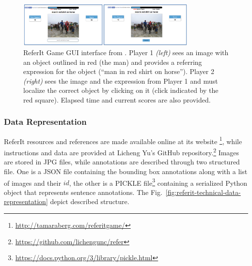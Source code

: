 \begin{figure}
  \centering
  \includegraphics[width=0.8\textwidth]{figures/referitgame-example.png}
  \caption[ReferIt Game GUI interface]{ ReferIt Game GUI interface
  from \cite{kazemzadeh2014referitgame}. Player 1 \textit{(left)} sees
  an image with an object outlined in red (the man) and provides a
  referring expression for the object (``man in red shirt on horse'').
  Player 2 \textit{(right)} sees the image and the expression from
  Player 1 and must localize the correct object by clicking on it
  (click indicated by the red square). Elapsed time and current scores
  are also provided. }
  \label{fig:referitgame-example}
\end{figure}

\subsubsection{Data Representation}
\label{subsec:referit-data-representation}

ReferIt resources and references are made available online at its
website
\footnote{\href{http://tamaraberg.com/referitgame/}{http://tamaraberg.com/referitgame/}},
while instructions and data are provided at Licheng Yu's GitHub
repository.\footnote{\href{https://github.com/lichengunc/refer}{https://github.com/lichengunc/refer}}
Images are stored in JPG files, while annotations are described
through two structured file. One is a JSON file containing the
bounding box annotations along with a list of images and their $id$,
the other is a PICKLE
file\footnote{\href{https://docs.python.org/3/library/pickle.html}{https://docs.python.org/3/library/pickle.html}}
containing a serialized Python object that represents sentence
annotations. The Fig.~\ref{fig:referit-technical-data-representation}
depict described structure.

